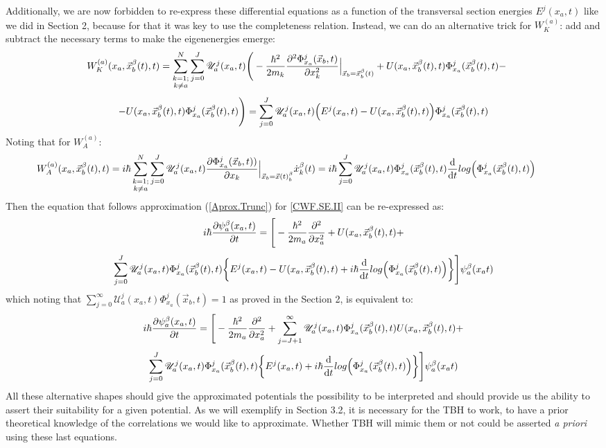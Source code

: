 \documentclass[11pt, a4paper]{article} %
\newcommand{\U}{\mathscr{U}}
\begin{document}
Additionally, we are now forbidden to re-express these differential equations as a function of the transversal section energies $E^j(x_a,t)$ like we did in Section 2, because for that it was key to use the completeness relation. Instead, we can do an alternative trick for $W^{(a)}_K$: add and subtract the necessary terms to make the eigenenergies emerge:
$$
\hspace{-0.5cm} W_K^{(a)}(x_a, \vec{x}_b^\beta (t),t)= \sum_{\substack{k=1; \\ k\neq a}}^{N} \sum_{j=0}^J \U^j_a(x_a,t) \Bigg( -\frac{\hbar^2}{2m_k} \pdv[2]{ \Phi_{x_a}^j(\vec{x}_b,t)}{x_k}\Big\rvert_{\vec{x}_b=\vec{x}_b^\beta(t)} +U(x_a, \vec{x}_b^\beta(t), t)\Phi_{x_a}^j(\vec{x}_b^\beta(t),t) -
$$
$$
- U(x_a, \vec{x}_b^\beta(t), t)\Phi_{x_a}^j(\vec{x}_b^\beta(t),t)\Bigg)=\sum_{j=0}^J \U^j_a(x_a,t)\qty( E^j(x_a,t)-U(x_a, \vec{x}_b^\beta(t), t)) \Phi^j_{x_a}(\vec{x}_b^\beta(t),t)
$$
Noting that for $W^{(a)}_A$:
$$
\hspace{-1.25cm}W_A^{(a)}(x_a, \vec{x}_b^\beta (t),t)=i\hbar\sum_{\substack{k=1; \\ k\neq a}}^{N} \sum_{j=0}^J \U^j_a(x_a,t) \pdv{ \Phi_{x_a}^j(\vec{x}_b,t))}{x_k}\Big\rvert_{\vec{x}_b=\vec{x}(t)_b^\beta} \dot{x}_k^\beta(t)=i\hbar\sum_{j=0}^J\U^j_a(x_a,t)\Phi_{x_a}^j(\vec{x}_b^\beta(t),t)\dv{}{t}log\qty(\Phi_{x_a}^j(\vec{x}_b^\beta(t),t))
$$
Then the equation that follows approximation (\ref{Aprox.Trunc}) for \ref{CWF.SE.II} can be re-expressed as:
$$
i\hbar \pdv{\psi_a^\beta(x_a, t)}{t} = \Bigg[- \frac{\hbar^2}{2m_a}\pdv[2]{}{x_a} + U(x_a, \vec{x}_b^\beta(t), t)+ 
$$
$$
\sum_{j=0}^J \U^j_a(x_a,t)\Phi^j_{x_a}(\vec{x}_b^\beta(t),t)\qty{ E^j(x_a,t)-U(x_a, \vec{x}_b^\beta(t), t) +i\hbar\dv{}{t}log\qty(\Phi_{x_a}^j(\vec{x}_b^\beta(t),t))}  \Bigg]\psi_a^\beta(x_a t)
$$
which noting that $\sum_{j=0}^\infty \U^j_a(x_a,t)\Phi^j_{x_a}(\vec{x}_b,t)=1$ as proved in the Section 2, is equivalent to:
$$
i\hbar \pdv{\psi_a^\beta(x_a, t)}{t} = \Bigg[- \frac{\hbar^2}{2m_a}\pdv[2]{}{x_a} + \sum_{j=J+1}^\infty \U^j_a(x_a,t)\Phi^j_{x_a}(\vec{x}_b^\beta(t),t)U(x_a, \vec{x}_b^\beta(t), t)+ 
$$
$$
\sum_{j=0}^J \U^j_a(x_a,t)\Phi^j_{x_a}(\vec{x}_b^\beta(t),t)\qty{ E^j(x_a,t)+i\hbar\dv{}{t}log\qty(\Phi_{x_a}^j(\vec{x}_b^\beta(t),t))}  \Bigg]\psi_a^\beta(x_a t)
$$
All these alternative shapes should give the approximated potentials the possibility to be interpreted and should provide us the ability to assert their suitability for a given potential. As we will exemplify in Section 3.2, it is necessary for the TBH to work, to have a prior theoretical knowledge of the correlations we would like to approximate. Whether TBH will mimic them or not could be asserted {\em a priori} using these last equations.
\newpage
\end{document}
